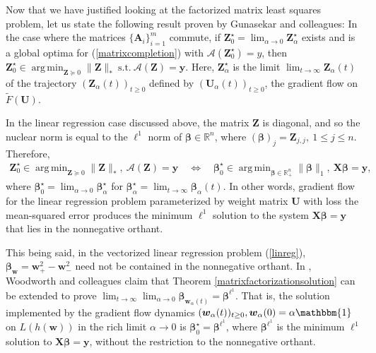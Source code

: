 \documentclass{article}
\DeclareMathOperator*{\argmin}{arg\,min}
\newenvironment{manualtheorem}[1]{%
  \renewcommand\themanualtheoreminner{#1}%
  \manualtheoreminner
}{\endmanualtheoreminner}
\begin{document}
Now that we have justified looking at the factorized matrix least squares problem, let us state the following result proven by Gunasekar and colleagues:
\begin{manualtheorem}{1}[from \cite{gunasekar2018implicit}]\label{matrixfactorizationsolution}
In the case where the matrices $\{\boldsymbol{A}_i\}_{i=1}^m$ commute, if $\boldsymbol{Z}_0^{\star} = \lim_{\alpha \rightarrow 0} \boldsymbol{Z}_{\alpha}^{\star}$ exists and is a global optima for (\ref{matrixcompletion}) with $\mathcal{A}(\boldsymbol{Z}_0^{\star}) = y$, then $\boldsymbol{Z}_0^{\star} \in \argmin_{\boldsymbol{Z} \succeq 0} \|\boldsymbol{Z} \|_* \ \text{s.t.} \ \mathcal{A}(\boldsymbol{Z}) = \boldsymbol{y}$. Here, $\boldsymbol{Z}_{\alpha}^{\star}$ is the limit $\lim_{t \to \infty} \boldsymbol{Z}_{\alpha}(t)$ of the trajectory $(\boldsymbol{Z}_{\alpha}(t))_{t \geq 0}$ defined by $(\boldsymbol{U}_{\alpha}(t))_{t \geq 0}$, the gradient flow on $\widetilde{F}(\boldsymbol{U})$.
\end{manualtheorem}

In the linear regression case discussed above, the matrix $\boldsymbol{Z}$ is diagonal, and so the nuclear norm is equal to the $\ell^1$ norm of $\boldsymbol{\beta} \in \mathbb{R}^n$, where $(\boldsymbol{\beta})_j = \boldsymbol{Z}_{j, j}, \ 1 \leq j \leq n$. Therefore,
\begin{align*}
    \boldsymbol{Z}_0^{\star} \in \argmin_{\boldsymbol{Z} \succeq 0} \|\boldsymbol{Z} \|_*, \ \mathcal{A}(\boldsymbol{Z}) = \boldsymbol{y} \quad \Longleftrightarrow \quad \boldsymbol{\beta}_0^{\star} \in \argmin_{\boldsymbol{\beta} \in \mathbb{R}_+^n} \| \boldsymbol{\beta} \|_1, \ \boldsymbol{X} \boldsymbol{\beta} = \boldsymbol{y},
\end{align*}
where $\boldsymbol{\beta}_0^{\star} = \lim_{\alpha \to 0} \boldsymbol{\beta}_{\alpha}^{\star}$ for $\boldsymbol{\beta}_{\alpha}^{\star} = \lim_{t \to \infty} \boldsymbol{\beta}_{\alpha}(t)$. In other words, gradient flow for the linear regression problem parameterized by weight matrix $\boldsymbol{U}$ with loss the mean-squared error produces the minimum $\ell^1$ solution to the system $\boldsymbol{X}\boldsymbol{\beta} = \boldsymbol{y}$ that lies in the nonnegative orthant.

This being said, in the vectorized linear regression problem (\ref{linreg}), $\boldsymbol{\beta}_{\boldsymbol{w}} = \boldsymbol{w}_+^2 - \boldsymbol{w}_-^2$ need not be contained in the nonnegative orthant. In \cite{woodworth2020kernel}, Woodworth and colleagues claim that Theorem \ref{matrixfactorizationsolution} can be extended to prove $\lim_{t \to \infty} \lim_{\alpha \to 0} \boldsymbol{\beta}_{\boldsymbol{w}_{\alpha}(t)} = \boldsymbol{\beta}^{\ell^1}$. That is, the solution implemented by the gradient flow dynamics $(\boldsymbol{w}_{\alpha}(t))_{t \geq 0}, \boldsymbol{w}_{\alpha}(0) = \alpha \mathbbm{1}$ on $L(h(\boldsymbol{w}))$ in the rich limit $\alpha \rightarrow 0$ is $\boldsymbol{\beta}_0^{\star} = \boldsymbol{\beta}^{\ell^1}$, where $\boldsymbol{\beta}^{\ell^1}$ is the minimum $\ell^1$ solution to $\boldsymbol{X} \boldsymbol{\beta} = \boldsymbol{y}$, without the restriction to the nonnegative orthant.
\end{document}
